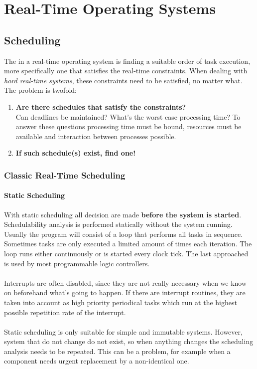 

\chapter{Real-Time Operating Systems}

\section{Scheduling}
The  in a real-time operating system is finding a suitable order of task execution, more specifically one that satisfies the real-time constraints.
When dealing with \textit{hard real-time systems}, these constraints need to be satisfied, no matter what. The problem is twofold:

\begin{enumerate}
	\item \textbf{Are there schedules that satisfy the constraints?} \\
	Can deadlines be maintained? What's the worst case processing time? To answer these questions processing time must be bound, resources must be available and interaction between processes possible. 
	\item \textbf{If such schedule(s) exist, find one!}
\end{enumerate}

\subsection{Classic Real-Time Scheduling}
\subsubsection{Static Scheduling}
With static scheduling all decision are made \textbf{before the system is started}. Schedulability analysis is performed statically without the system running. Usually the program will consist of a loop that performs all tasks in sequence. Sometimes tasks are only executed a limited amount of times each iteration. The loop runs either continuously or is started every clock tick. The last approached is used by most programmable logic controllers.
\\\\
Interrupts are often disabled, since they are not really necessary when we know on beforehand what's going to happen. If there are interrupt routines, they are taken into account as high priority periodical tasks which run at the highest possible repetition rate of the interrupt.
\\\\
Static scheduling is only suitable for simple and immutable systems. However, system that do not change do not exist, so when anything changes the scheduling analysis needs to be repeated. This can be a problem, for example when a component needs urgent replacement by a non-identical one.

